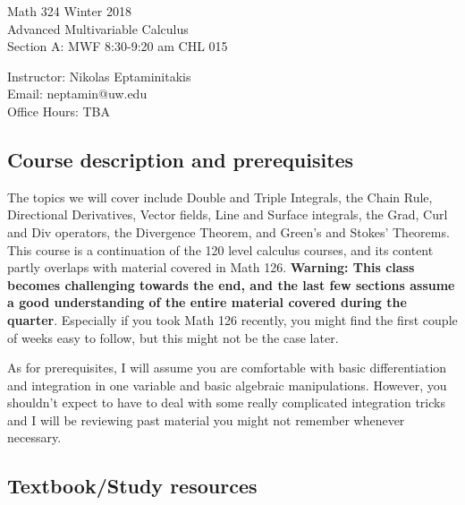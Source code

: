 \documentclass[11pt]{article}
\begin{document}
 \noindent\LARGE Math 324 Winter 2018 \\
 \LARGE Advanced Multivariable Calculus \\
 \large Section A: MWF 8:30-9:20 am	CHL 015  \\

\vspace{2mm}


\noindent\large Instructor: Nikolas Eptaminitakis\\
\large Email: neptamin@uw.edu \\
\large Office Hours: TBA
\vspace{1mm}

\subsection*{Course description and prerequisites}
 The topics we will cover include Double and Triple Integrals, the Chain Rule, Directional Derivatives, Vector fields, Line and Surface integrals, the Grad, Curl and Div operators, the Divergence Theorem, and Green's and Stokes' Theorems. This course is a continuation of the 120 level calculus courses, and its content partly overlaps with material covered in Math 126. \textbf{Warning: This class becomes challenging towards the end, and the last few sections assume a good understanding of the entire material covered during the quarter}. Especially if you took Math 126 recently, you might find the first couple of weeks easy to follow, but this might not be the case later.

	As for prerequisites, I will assume you are comfortable with basic differentiation and integration in one variable and basic algebraic manipulations. However, you shouldn't expect to have to deal with some really complicated integration tricks and I will be reviewing past material you might not remember whenever necessary.


\vspace{1mm}
\subsection*{Textbook/Study resources}
\end{document}
